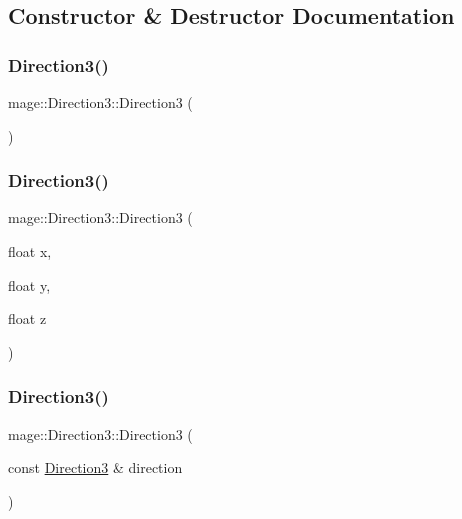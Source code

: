 \subsection{Constructor \& Destructor Documentation}
\hypertarget{structmage_1_1_direction3_a29603b6349c5a313d5bd93e0b0235ff1}{}\label{structmage_1_1_direction3_a29603b6349c5a313d5bd93e0b0235ff1} 
\subsubsection{\texorpdfstring{Direction3()}{Direction3()}\hspace{0.1cm}{\footnotesize\ttfamily [1/6]}}
{\footnotesize\ttfamily mage\+::\+Direction3\+::\+Direction3 (\begin{DoxyParamCaption}{ }\end{DoxyParamCaption})}

\hypertarget{structmage_1_1_direction3_a1b2cd4ce14856da23dfa9c5facc90da2}{}\label{structmage_1_1_direction3_a1b2cd4ce14856da23dfa9c5facc90da2} 
\subsubsection{\texorpdfstring{Direction3()}{Direction3()}\hspace{0.1cm}{\footnotesize\ttfamily [2/6]}}
{\footnotesize\ttfamily mage\+::\+Direction3\+::\+Direction3 (\begin{DoxyParamCaption}\item[{float}]{x,  }\item[{float}]{y,  }\item[{float}]{z }\end{DoxyParamCaption})}

\hypertarget{structmage_1_1_direction3_a8f6264f5a7a7590e67f4efa8f0687cdd}{}\label{structmage_1_1_direction3_a8f6264f5a7a7590e67f4efa8f0687cdd} 
\subsubsection{\texorpdfstring{Direction3()}{Direction3()}\hspace{0.1cm}{\footnotesize\ttfamily [3/6]}}
{\footnotesize\ttfamily mage\+::\+Direction3\+::\+Direction3 (\begin{DoxyParamCaption}\item[{const \hyperlink{structmage_1_1_direction3}{Direction3} \&}]{direction }\end{DoxyParamCaption})}

